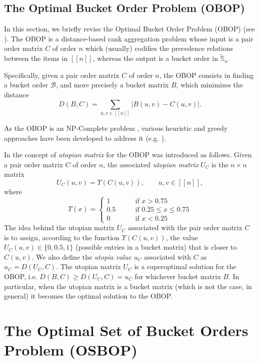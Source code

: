 \documentclass[preprint,12pt]{article}
\theoremstyle{definition}
\theoremstyle{remark}
\theoremstyle{example} %
\begin{document}
\subsection{The Optimal Bucket Order Problem (OBOP)} \label{sec:OBOP}
In this section, we briefly revise the  Optimal Bucket Order Problem (OBOP) (see \cite{Gionis2006,Ukkonen2009}). 
The OBOP is a distance-based rank aggregation problem whose input is a pair order matrix $C$ of order $n$ which (usually) codifies the precedence relations between the items in $[[n]]$, whereas the output is a bucket order in $\widetilde{\mathbb{S}}_n$.

Specifically, given a pair order matrix $C$ of order $n$, the OBOP consists in finding a bucket order $\mathcal{B}$, and more precisely a bucket matrix $B$, which minimizes the distance
\begin{equation}
D(B,C)=\sum_{u,v\in [[n]]} |B(u,v)-C(u,v)|.
\end{equation}

As the OBOP is an NP-Complete problem \cite{Gionis2006}, various heuristic and greedy approaches have been developed to address it (e.g. \cite{Aledo2018-ES-EJOR, Aledo2021,Ukkonen2009}).

In \cite{Aledo2017Utopia} the concept of \emph{ utopian matrix} for the OBOP was introduced as follows. Given a pair order matrix $C$ of order $n$, 
the associated \emph{utopian matrix} $U_C$ is the $n\times n$ matrix 
\[
U_C(u,v)=\Upsilon(C(u,v)), \qquad u,v\in [[n]],
\]
where
\[
\Upsilon(x)=\left\{
\begin{array}{rl}
1 \qquad &  \mbox{if $x > 0.75$} \\
0.5 \qquad &  \mbox{if $0.25\leq x \leq 0.75$} \\
0 \qquad &  \mbox{if $x < 0.25$}
\end{array}
\right.
\]
The idea behind the utopian matrix $U_C$ associated with the pair order matrix $C$ is to assign, according to the function $\Upsilon(C(u,v))$, the value $U_C(u,v)\in \{0,0.5,1\}$ (possible entries in a bucket matrix) that is closer to $C(u,v)$.  
We also define the \emph{utopia value} $u_C$ associated with $C$ as $u_C=D(U_C,C)$.  
The utopian matrix $U_C$ is a superoptimal solution for the OBOP, i.e. $D(B,C)\geq D(U_C,C)= u_C$ for whichever bucket matrix $B$.
In particular, when the utopian matrix is a bucket matrix (which is not the case, in general) it becomes the optimal solution to the OBOP.



\section{The Optimal Set of Bucket Orders Problem (OSBOP)}
\label{sec:OSBOP}
\end{document}
